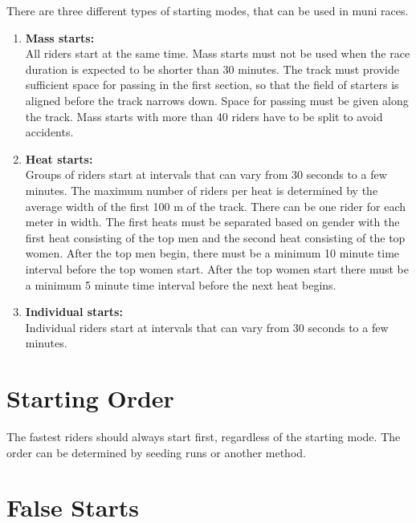 There are three different types of starting modes, that can be used in muni races.
\begin{enumerate}
\item \textbf{Mass starts:}\\
All riders start at the same time.
Mass starts must not be used when the race duration is expected to be shorter than 30 minutes.
The track must provide sufficient space for passing in the first section, so that the field of starters is aligned before the track narrows down.
Space for passing must be given along the track.
Mass starts with more than 40 riders have to be split to avoid accidents.
\item \textbf{Heat starts:}\\
Groups of riders start at intervals that can vary from 30 seconds to a few minutes.
The maximum number of riders per heat is determined by the average width of the first 100 m of the track.
There can be one rider for each meter in width.
The first heats must be separated based on gender with the first heat consisting of the top men and the second heat consisting of the top women.
After the top men begin, there must be a minimum 10 minute time interval before the top women start.
After the top women start there must be a minimum 5 minute time interval before the next heat begins.
\item \textbf{Individual starts:}\\
Individual riders start at intervals that can vary from 30 seconds to a few minutes.
\end{enumerate}

\section{Starting Order}

The fastest riders should always start first, regardless of the starting mode.
The order can be determined by seeding runs or another method.

\section{False Starts}

